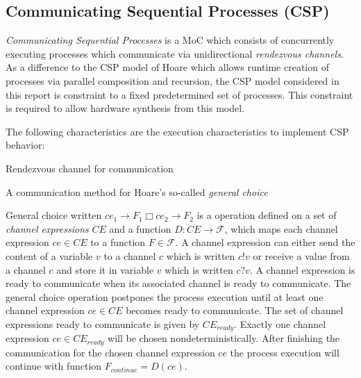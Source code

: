 \subsection{Communicating Sequential Processes (CSP)}
\emph{Communicating Sequential Processes} \cite{csphoare:1985}
is a MoC which consists of concurrently executing processes
which communicate via unidirectional \emph{rendezvous channels}.
As a difference to the CSP model of Hoare \cite{csphoare:1985}
which allows runtime creation of processes via parallel
composition and recursion, the CSP model considered in this report
is constraint to a fixed predetermined set of processes.
This constraint is required to allow hardware synthesis from this
model.

The following characteristics are the execution characteristics to
implement CSP behavior:

\begin{characteristic}\label{characteristic-csp-rendezvous}
  Rendezvous channel for communication
\end{characteristic}

\begin{characteristic}\label{characteristic-csp-general-choice}
  A communication method for Hoare's so-called \emph{general choice}
  
  General choice written $ce_{1} \to F_1 \Box ce_{2} \to F_2$
  is a operation defined on a set of \emph{channel expressions} $CE$ and
  a function $D: CE \to \mathcal{F}$, which maps each channel expression
  $ce \in CE$ to a function $F \in \mathcal{F}$. A channel
  expression can either send the content of a variable $v$ to
  a channel $c$ which is written $c!v$ or receive a value from
  a channel $c$ and store it in variable $v$ which is written
  $c?v$. A channel expression is ready to communicate when its
  associated channel is ready to communicate.
  The general choice operation postpones the process execution 
  until at least one channel expression $ce \in CE$
  becomes ready to communicate. The set of channel expressions
  ready to communicate is given by $CE_{ready}$.
  Exactly one channel expression $ce \in CE_{ready}$
  will be chosen nondeterministically. After
  finishing the communication for the chosen channel expression $ce$
  the process execution will continue
  with function $F_{continue} = D(ce)$.

\end{characteristic}

